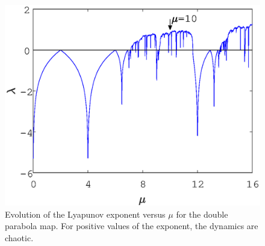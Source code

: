 
\begin{figure}
	\centering
	\includegraphics[width=1\linewidth]{Images/P1/Alt_Lyapunov.eps}
	\caption{Evolution of the Lyapunov exponent versus $\mu$ for the double parabola map. For positive values of the exponent, the dynamics are chaotic.}
	\label{Alt_Lyapunov}
\end{figure}




